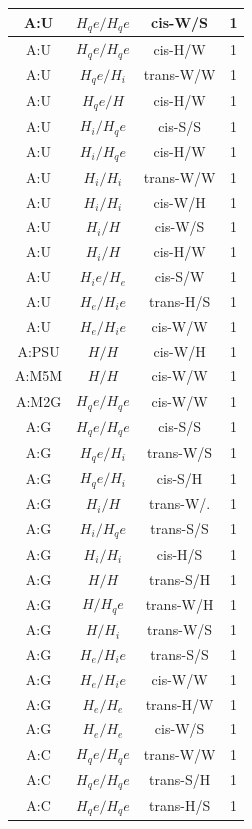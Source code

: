 \begin{center}
\begin{longtable}{c|c|c|c}
A:U & $H_qe/H_qe$ & cis-W/S & 1 \\  \hline
A:U & $H_qe/H_qe$ & cis-H/W & 1 \\  \hline
A:U & $H_qe/H_i$ & trans-W/W & 1 \\  \hline
A:U & $H_qe/H$ & cis-H/W & 1 \\  \hline
A:U & $H_i/H_qe$ & cis-S/S & 1 \\  \hline
A:U & $H_i/H_qe$ & cis-H/W & 1 \\  \hline
A:U & $H_i/H_i$ & trans-W/W & 1 \\  \hline
A:U & $H_i/H_i$ & cis-W/H & 1 \\  \hline
A:U & $H_i/H$ & cis-W/S & 1 \\  \hline
A:U & $H_i/H$ & cis-H/W & 1 \\  \hline
A:U & $H_ie/H_e$ & cis-S/W & 1 \\  \hline
A:U & $H_e/H_ie$ & trans-H/S & 1 \\  \hline
A:U & $H_e/H_ie$ & cis-W/W & 1 \\  \hline
A:PSU & $H/H$ & cis-W/H & 1 \\  \hline
A:M5M & $H/H$ & cis-W/W & 1 \\  \hline
A:M2G & $H_qe/H_qe$ & cis-W/W & 1 \\  \hline
A:G & $H_qe/H_qe$ & cis-S/S & 1 \\  \hline
A:G & $H_qe/H_i$ & trans-W/S & 1 \\  \hline
A:G & $H_qe/H_i$ & cis-S/H & 1 \\  \hline
A:G & $H_i/H$ & trans-W/. & 1 \\  \hline
A:G & $H_i/H_qe$ & trans-S/S & 1 \\  \hline
A:G & $H_i/H_i$ & cis-H/S & 1 \\  \hline
A:G & $H/H$ & trans-S/H & 1 \\  \hline
A:G & $H/H_qe$ & trans-W/H & 1 \\  \hline
A:G & $H/H_i$ & trans-W/S & 1 \\  \hline
A:G & $H_e/H_ie$ & trans-S/S & 1 \\  \hline
A:G & $H_e/H_ie$ & cis-W/W & 1 \\  \hline
A:G & $H_e/H_e$ & trans-H/W & 1 \\  \hline
A:G & $H_e/H_e$ & cis-W/S & 1 \\  \hline
A:C & $H_qe/H_qe$ & trans-W/W & 1 \\  \hline
A:C & $H_qe/H_qe$ & trans-S/H & 1 \\  \hline
A:C & $H_qe/H_qe$ & trans-H/S & 1 \\  \hline

\end{longtable}
\end{center}
